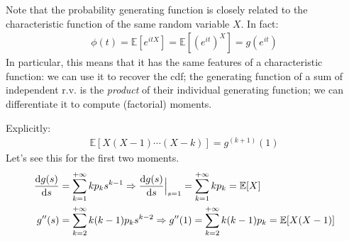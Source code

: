\documentclass[../template.tex]{subfiles}
\begin{document}
\medskip

Note that the probability generating function is closely related to the characteristic function of the same random variable $X$. In fact:
\begin{align*}
    \phi(t) = \mathbb{E}[e^{itX}] = \mathbb{E}[(e^{it})^X] = g(e^{it})
\end{align*}
In particular, this means that it has the same features of a characteristic function: we can use it to recover the cdf; the generating function of a sum of independent r.v. is the \textit{product} of their individual generating function; we can differentiate it to compute (factorial) moments.

\medskip

Explicitly:
\begin{align}\label{eqn:prob-gen-mom}
    \mathbb{E}[X(X-1) \cdots (X-k)] = g^{(k+1)}(1)
\end{align}
Let's see this for the first two moments.
\begin{align*}
    \dv{g(s)}{s} &= \sum_{k=1}^{+\infty} k p_k s^{k-1} \Rightarrow \dv{g(s)}{s} \Big|_{s=1} = \sum_{k=1}^{+\infty} k p_k = \mathbb{E}[X]\\
    g''(s) &= \sum_{k=2}^{+\infty} k(k-1) p_k s^{k-2} \Rightarrow g''(1) = \sum_{k=2}^{+\infty} k(k-1) p_k = \mathbb{E}[X(X-1)]
\end{align*}
\end{document}
